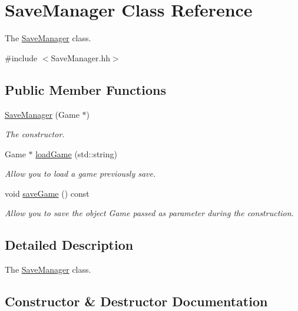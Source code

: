 \hypertarget{classSaveManager}{}\section{Save\+Manager Class Reference}
\label{classSaveManager}


The \hyperlink{classSaveManager}{Save\+Manager} class.  




{\ttfamily \#include $<$Save\+Manager.\+hh$>$}

\subsection*{Public Member Functions}
\begin{DoxyCompactItemize}
\item 
\hyperlink{classSaveManager_a1c5138a7d931f66e599f753102d9c148}{Save\+Manager} (Game $\ast$)
\begin{DoxyCompactList}\small\item\em The constructor. \end{DoxyCompactList}\item 
Game $\ast$ \hyperlink{classSaveManager_aca377b93a5ebf5df19e313861d0ad5d4}{load\+Game} (std\+::string)
\begin{DoxyCompactList}\small\item\em Allow you to load a game previously save. \end{DoxyCompactList}\item 
\mbox{\label{classSaveManager_a9e9523af0b634390e6bed4edf20f4007}} 
void \hyperlink{classSaveManager_a9e9523af0b634390e6bed4edf20f4007}{save\+Game} () const
\begin{DoxyCompactList}\small\item\em Allow you to save the object Game passed as parameter during the construction. \end{DoxyCompactList}\end{DoxyCompactItemize}


\subsection{Detailed Description}
The \hyperlink{classSaveManager}{Save\+Manager} class. 

\subsection{Constructor \& Destructor Documentation}
\mbox{\label{classSaveManager_a1c5138a7d931f66e599f753102d9c148}} 
